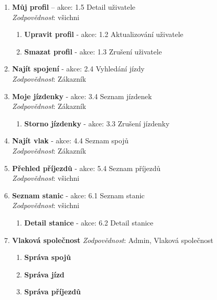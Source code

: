 \documentclass[11pt]{article}
\begin{document}
\begin{enumerate}
    \item \textbf{Můj profil} – akce: 1.5 Detail uživatele\\
        \textit{Zodpovědnost}: všichni
        \begin{enumerate}
            \item \textbf{Upravit profil} - akce: 1.2 Aktualizování uživatele
            \item \textbf{Smazat profil} - akce: 1.3 Zrušení uživatele
        \end{enumerate}

    \item \textbf{Najít spojení} - akce: 2.4 Vyhledání jízdy\\
        \textit{Zodpovědnost}: Zákazník

    \item \textbf{Moje jízdenky} - akce: 3.4 Seznam jízdenek\\
        \textit{Zodpovědnost}: Zákazník
        \begin{enumerate}
            \item \textbf{Storno jízdenky} - akce: 3.3 Zrušení jízdenky
        \end{enumerate}
    
    \item \textbf{Najít vlak} - akce: 4.4 Seznam spojů\\
        \textit{Zodpovědnost}: Zákazník

    \item \textbf{Přehled příjezdů} - akce: 5.4 Seznam příjezdů\\
        \textit{Zodpovědnost}: všichni

    \item \textbf{Seznam stanic} - akce: 6.1 Seznam stanic\\
        \textit{Zodpovědnost}: všichni
        \begin{enumerate}
            \item \textbf{Detail stanice} - akce: 6.2 Detail stanice
        \end{enumerate}

    \item \textbf{Vlaková společnost}
        \textit{Zodpovědnost}: Admin, Vlaková společnost
        \begin{enumerate}
            \item \textbf{Správa spojů}
            \item \textbf{Správa jízd}
            \item \textbf{Správa příjezdů}
        \end{enumerate}
    

\end{enumerate}
\end{document}
